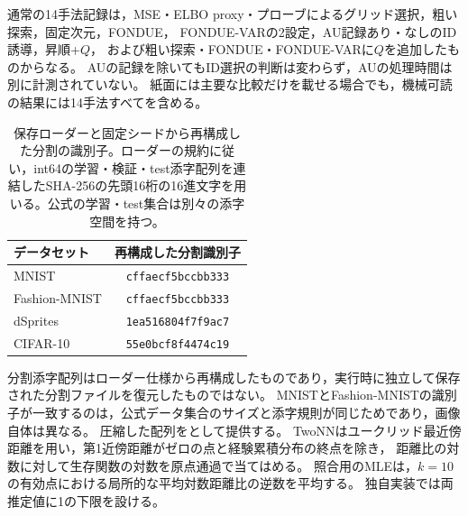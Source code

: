 \documentclass[11pt,a4paper]{ltjsarticle}
\begin{document}
通常の14手法記録は，MSE・ELBO proxy・プローブによるグリッド選択，粗い探索，固定次元，FONDUE，
FONDUE-VARの2設定，AU記録あり・なしのID誘導，昇順+$Q$，
および粗い探索・FONDUE・FONDUE-VARに$Q$を追加したものからなる。
AUの記録を除いてもID選択の判断は変わらず，AUの処理時間は別に計測されていない。
紙面には主要な比較だけを載せる場合でも，機械可読の結果には14手法すべてを含める。

\begin{table}[H]
\caption{保存ローダーと固定シードから再構成した分割の識別子。ローダーの規約に従い，int64の学習・検証・test添字配列を連結したSHA-256の先頭16桁の16進文字を用いる。公式の学習・test集合は別々の添字空間を持つ。}\label{tab:splits}
\small
\setlength{\tabcolsep}{3.5pt}
\begin{tabular*}{\textwidth}{@{\extracolsep{\fill}}lc@{}}
\toprule
データセット & 再構成した分割識別子 \\
\midrule
MNIST & \texttt{cffaecf5bccbb333} \\
Fashion-MNIST & \texttt{cffaecf5bccbb333} \\
dSprites & \texttt{1ea516804f7f9ac7} \\
CIFAR-10 & \texttt{55e0bcf8f4474c19} \\
\bottomrule
\end{tabular*}
\end{table}
分割添字配列はローダー仕様から再構成したものであり，実行時に独立して保存された分割ファイルを復元したものではない。
MNISTとFashion-MNISTの識別子が一致するのは，公式データ集合のサイズと添字規則が同じためであり，画像自体は異なる。
圧縮した配列をとして提供する。
TwoNNはユークリッド最近傍距離を用い，第1近傍距離がゼロの点と経験累積分布の終点を除き，
距離比の対数に対して生存関数の対数を原点通過で当てはめる。
照合用のMLEは，$k=10$の有効点における局所的な平均対数距離比の逆数を平均する。
独自実装では両推定値に1の下限を設ける。
\end{document}
